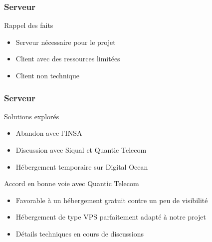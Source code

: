 \speaker{\Matthieu}

\begin{frame}
	\frametitle{Serveur}
	\begin{block}{Rappel des faits}
      \begin{itemize}
        \item Serveur nécessaire pour le projet
        \item Client avec des ressources limitées
        \item Client non technique
      \end{itemize}
     \end{block}

	\frametitle{Serveur}
	\begin{block}{Solutions explorés}
      \begin{itemize}
        \item Abandon avec l'INSA
        \item Discussion avec Siqual et Quantic Telecom
        \item Hébergement temporaire sur Digital Ocean
      \end{itemize}
     \end{block}
\end{frame}

\begin{frame}
    \begin{block}{Accord en bonne voie avec Quantic Telecom}
	  \begin{itemize}
		\item Favorable à un hébergement gratuit contre un peu de visibilité
		\item Hébergement de type VPS parfaitement adapté à notre projet
		\item Détails techniques en cours de discussions
	  \end{itemize}
	\end{block}
\end{frame}

